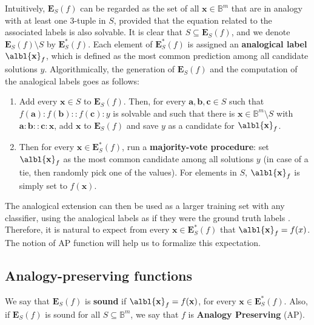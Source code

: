 \documentclass[article]{amsart}
\begin{document}
Intuitively,  $\mathbf{E}_S(f)$ can be regarded as the set of all $\mathbf{x}
\in \mathbb{B}^m$ that are in analogy with at least one 3-tuple in $S$, provided that
the equation related to the associated labels is also solvable.  It is clear
that $S \subseteq \mathbf{E}_S(f)$, and we denote $\mathbf{E}_S(f) \setminus S$
by $\mathbf{E}_S^*(f)$. Each element of $\mathbf{E}_S^*(f)$ is assigned an
\textbf{analogical label} $\albl{\mathbf{x}}_f$, which is defined as the most
common prediction among all candidate solutions $y$. Algorithmically, the
generation of $\mathbf{E}_S(f)$ and the computation of the analogical labels
goes as follows:
\begin{enumerate}
  \item Add every $\mathbf{x} \in S$ to $\mathbf{E}_S(f)$. Then, for every
    $\mathbf{a},\mathbf{b},\mathbf{c} \in S$ such that $f(\mathbf{a}) :
    f(\mathbf{b}) :: f(\mathbf{c}) : y$ is solvable and such that there is
    $\mathbf{x} \in \mathbb{B}^m \setminus S$ with $\mathbf{a} : \mathbf{b} ::
    \mathbf{c} : \mathbf{x}$, add $\mathbf{x}$ to $\mathbf{E}_S(f)$ and save
    $y$ as a candidate for $\albl{\mathbf{x}}_f$.
\item Then for every $\mathbf{x} \in \mathbf{E}_S^*(f)$, run a
  \textbf{majority-vote procedure}: set $\albl{\mathbf{x}}_f$ as the most
    common candidate among all solutions $y$ (in case of a tie, then randomly
    pick one of the values). For elements in $S$, $\albl{\mathbf{x}}_f$ is
    simply set to $f(\mathbf{x})$.
\end{enumerate}

The analogical extension can then be used as a larger training set with any
classifier, using the analogical labels as if they were the ground truth
labels \cite{HugPraRicSerECAI2016}. Therefore, it is natural to expect from
every $\mathbf{x} \in \mathbf{E}_S^*(f)$ that $\albl{\mathbf{x}}_f=f(x)$. The
notion of AP function will help us to formalize this expectation.

\subsection{Analogy-preserving functions}\label{analogy-preserv}

\begin{defi}
  We say that $\mathbf{E}_S(f)$ is {\bf sound} if
  $\albl{\mathbf{x}}_f=f(\mathbf{x})$, for every $\mathbf{x} \in
  \mathbf{E}^*_S(f)$. Also, if $\mathbf{E}_S(f)$ is sound for all $S \subseteq
  \mathbb{B}^m$, we say that $f$ is {\bf Analogy Preserving} (AP).
\end{defi}
\end{document}
